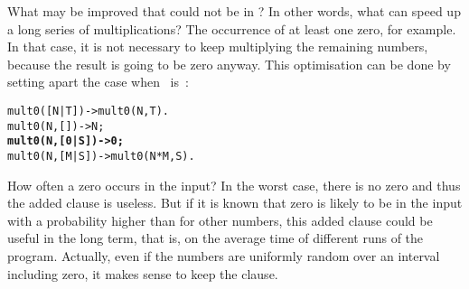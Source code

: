 What may be improved that could not be in ? In other
words, what can speed up a long series of multiplications? The
occurrence of at least one zero, for example. In that case, it is not
necessary to keep multiplying the remaining numbers, because the
result is going to be zero anyway. This optimisation can be done by
setting apart the case when ~is~:
\begin{alltt}
mult0([N|T])   -> mult0(N,T).
mult0(N,   []) -> N;
\textbf{mult0(N,[0|S]) -> 0;}\hfill% \emph{Improvement.}
mult0(N,[M|S]) -> mult0(N*M,S).
\end{alltt}
How often a zero occurs in the input? In the worst case, there is no
zero and thus the added clause is useless. But if it is known that
zero is likely to be in the input with a probability higher than for
other numbers, this added clause could be useful in the long term,
that is, on the average time of different runs of the
program. Actually, even if the numbers are uniformly random over an
interval including zero, it makes sense to keep the clause.



\label{sec:tail_call_opt}


